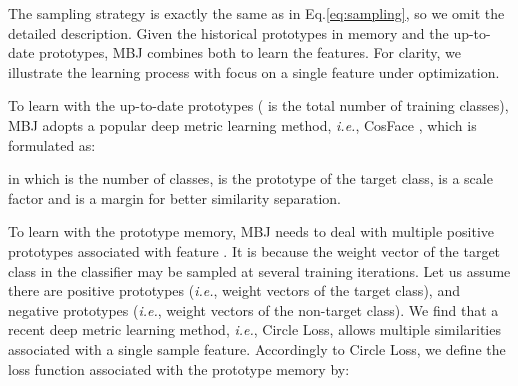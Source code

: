 \documentclass[final]{cvpr}
\def\ie{\textit{i.e.}}
\begin{document}
The sampling strategy is exactly the same as in Eq.\ref{eq:sampling}, so we omit the detailed description. Given the historical prototypes in memory and the up-to-date prototypes, MBJ combines both to learn the features. For clarity, we illustrate the learning process with focus on a single feature  under optimization. 

To learn with the up-to-date prototypes  ( is the total number of training classes), MBJ adopts a popular deep metric learning method, \ie, CosFace \cite{cosface}, which is formulated as:
\begin{small}

\end{small}
in which  is the number of classes,  is the prototype of the target class,  is a scale factor and  is a margin for better similarity separation.

To learn with the prototype memory, MBJ needs to deal with multiple positive prototypes associated with feature . It is because the weight vector of the target class in the classifier may be sampled at several training iterations. Let us assume there are  positive prototypes (\ie, weight vectors of the target class), and  negative prototypes  (\ie, weight vectors of the non-target class). We find that a recent deep metric learning method, \ie, Circle Loss\cite{circleloss}, allows multiple similarities associated with a single sample feature. 
Accordingly to Circle Loss, we define the loss function associated with the prototype memory by:
\begin{small}

\end{small}
\end{document}
